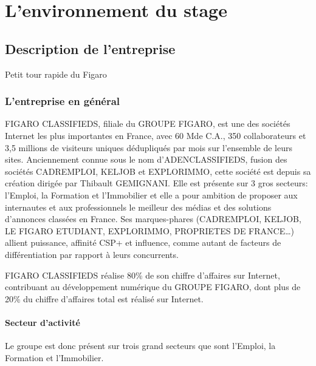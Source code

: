 
\chapter{L'environnement du stage} %

\label{environnement} %



\section{Description de l'entreprise}

Petit tour rapide du Figaro


\subsection{L'entreprise en général}
FIGARO CLASSIFIEDS, filiale du GROUPE FIGARO, est une des sociétés Internet les plus importantes en France, avec 60 M\texteuro de C.A., 350 collaborateurs et 3,5 millions de visiteurs uniques dédupliqués par mois sur l’ensemble de leurs sites.
Anciennement connue sous le nom d'ADENCLASSIFIEDS, fusion des sociétés CADREMPLOI, KELJOB et EXPLORIMMO, cette société est depuis sa création dirigée par Thibault GEMIGNANI.
Elle est présente sur 3 gros secteurs: l’Emploi, la Formation et l’Immobilier et elle a pour ambition de proposer aux internautes et aux professionnels le meilleur des médias et des solutions d'annonces classées en France.
Ses marques-phares (CADREMPLOI, KELJOB, LE FIGARO ETUDIANT, EXPLORIMMO, PROPRIETES DE FRANCE…) allient puissance, affinité CSP+ et influence, comme autant de facteurs de différentiation par rapport à leurs concurrents.

FIGARO CLASSIFIEDS réalise 80\% de son chiffre d’affaires sur Internet, contribuant au développement numérique du GROUPE FIGARO, dont plus de 20\% du chiffre d’affaires total est réalisé sur Internet.

\subsubsection{Secteur d'activité}
Le groupe est donc présent sur trois grand secteurs que sont l’Emploi, la Formation et l’Immobilier.
